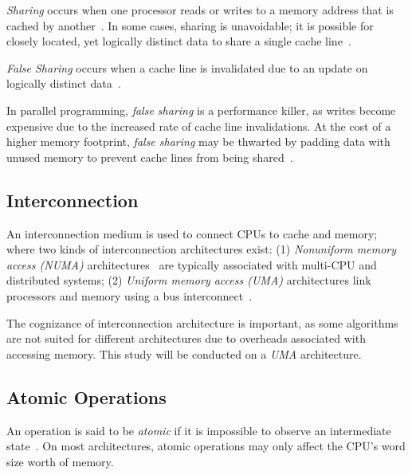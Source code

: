 \emph{Sharing} occurs when one processor reads or writes to a memory address that
is cached by another~\citep[Appendix~B.5.1]{herlihy2020art}. In some cases, sharing is unavoidable; it is possible for closely located, yet
logically distinct data to share a single cache
line~\citep[Appendix~B.5.1]{herlihy2020art}. 

\emph{False Sharing} occurs when a cache line is invalidated due to an update
on logically distinct data~\citep[Appendix~B.5.1]{herlihy2020art}. 

In parallel programming, \emph{false sharing} is a
performance killer, as writes become expensive due to the increased rate of
cache line invalidations. At the cost of a higher memory footprint, \emph{false
sharing} may be thwarted by padding data with unused memory to prevent cache
lines from being shared~\citep{scott2013shared}.

\subsection{Interconnection}

An interconnection medium is used to connect CPUs to cache and memory; where
two kinds of interconnection architectures exist: (1)
\emph{Nonuniform memory access (NUMA)}
architectures~\citep[Appendix~B.3]{herlihy2020art} are typically associated with
multi-CPU and distributed systems; (2) \emph{Uniform memory
access (UMA)} architectures link processors and memory using a bus
interconnect~\citep[Appendix~B.3]{herlihy2020art}.

The cognizance of interconnection architecture is important,
as some algorithms are not suited for different architectures due to
overheads associated with accessing memory. This study will be
conducted on a \emph{UMA} architecture.

\subsection{Atomic Operations}
An operation is said to be \emph{atomic} if it is impossible to observe an
intermediate state~\citep{perfbook2021}. On most architectures, atomic
operations may only affect the CPU's word size worth of memory.

